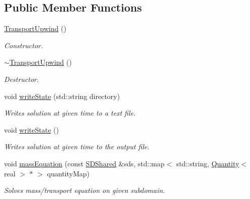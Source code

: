 \subsection*{Public Member Functions}
\begin{DoxyCompactItemize}
\item 
\hypertarget{classTransportUpwind_add9a1d8fbb788ea5612d93634c79a8b9}{
\hyperlink{classTransportUpwind_add9a1d8fbb788ea5612d93634c79a8b9}{TransportUpwind} ()}
\label{classTransportUpwind_add9a1d8fbb788ea5612d93634c79a8b9}

\begin{DoxyCompactList}\small\item\em Constructor. \item\end{DoxyCompactList}\item 
\hypertarget{classTransportUpwind_a05c9e8da697dfc51a2b8c3cfd19c2545}{
\hyperlink{classTransportUpwind_a05c9e8da697dfc51a2b8c3cfd19c2545}{$\sim$TransportUpwind} ()}
\label{classTransportUpwind_a05c9e8da697dfc51a2b8c3cfd19c2545}

\begin{DoxyCompactList}\small\item\em Destructor. \item\end{DoxyCompactList}\item 
void \hyperlink{classTransportUpwind_a6eb3dea8ecfa8441e56b0c0f8f787377}{writeState} (std::string directory)
\begin{DoxyCompactList}\small\item\em Writes solution at given time to a text file. \item\end{DoxyCompactList}\item 
void \hyperlink{classTransportUpwind_aad7f9cd10acf49402a6a4fe039669a34}{writeState} ()
\begin{DoxyCompactList}\small\item\em Writes solution at given time to the output file. \item\end{DoxyCompactList}\item 
void \hyperlink{classTransportUpwind_a1a59087c829238f58f028a544269be54}{massEquation} (const \hyperlink{classSDShared}{SDShared} \&sds, std::map$<$ std::string, \hyperlink{classQuantity}{Quantity}$<$ real $>$ $\ast$ $>$ quantityMap)
\begin{DoxyCompactList}\small\item\em Solves mass/transport equation on given subdomain. \item\end{DoxyCompactList}\end{DoxyCompactItemize}



